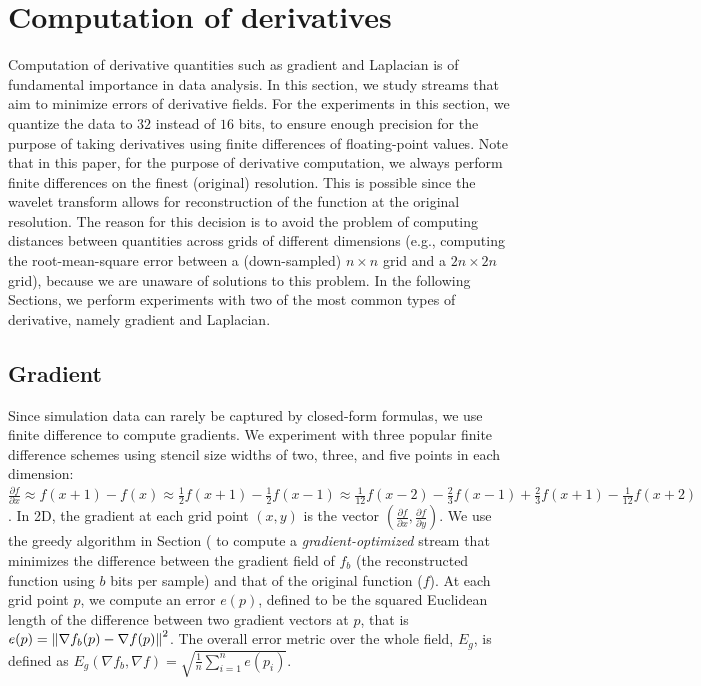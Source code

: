 \section{Computation of derivatives}
\label{sec:derivatives}

Computation of derivative quantities such as gradient and Laplacian is of fundamental importance in
data analysis. In this section, we study streams that aim to minimize errors of derivative fields.
For the experiments in this section, we quantize the data to $32$ instead of $16$ bits, to ensure
enough precision for the purpose of taking derivatives using finite differences of floating-point
values. Note that in this paper, for the purpose of derivative computation, we always perform finite
differences on the finest (original) resolution. This is possible since the wavelet transform allows
for reconstruction of the function at the original resolution. The reason for this decision is to
avoid the problem of computing distances between quantities across grids of different dimensions
(e.g., computing the root-mean-square error between a (down-sampled) $n\times n$ grid and a
$2n\times 2n$ grid), because we are unaware of solutions to this problem. In the following Sections,
we perform experiments with two of the most common types of derivative, namely gradient and
Laplacian.

\subsection{Gradient}

Since simulation data can rarely be captured by closed-form formulas, we use finite difference to
compute gradients. We experiment with three popular finite difference schemes using stencil size
widths of two, three, and five points in each dimension: $\frac{\partial f}{\partial x}\approx
f(x+1)-f(x)
\approx \frac{1}{2}f(x+1)-\frac{1}{2}f(x-1) \approx
\frac{1}{12}f(x-2)-\frac{2}{3}f(x-1)+\frac{2}{3}f(x+1)-\frac{1}{12}f(x+2)$. In 2D, the gradient at
each grid point $(x,y)$ is the vector $(\frac{\partial f}{\partial x},\frac{\partial f}{\partial
y})$. We use the greedy algorithm in Section ( to compute a
\emph{gradient-optimized} stream that minimizes the difference between the gradient field of $f_b$
(the reconstructed function using $b$ bits per sample) and that of the original function ($f$). At
each grid point $p$, we compute an error $e(p)$, defined to be the squared Euclidean length of the
difference between two gradient vectors at $p$, that is $e(p)=\left\lVert\nabla f_b(p)-\nabla f(p)\right\rVert^2$.
The overall error metric over the whole field, $E_g$, is defined as $E_g(\nabla f_b,\nabla
f)=\sqrt{\frac{1}{n}\sum_{i=1}^{n}{e(p_i)}}$.

